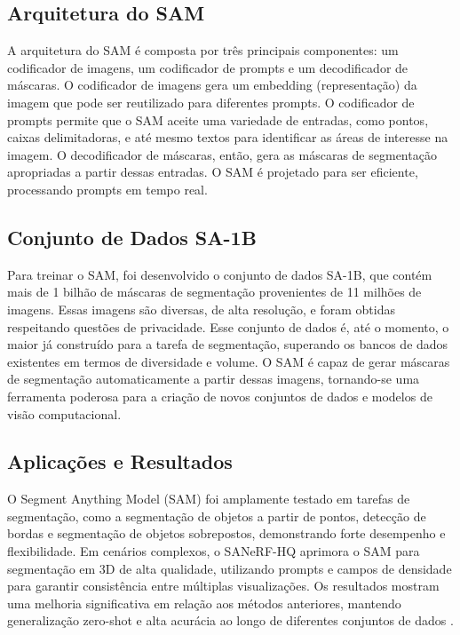 \subsection{Arquitetura do SAM}

A arquitetura do SAM é composta por três principais componentes: um codificador de imagens, um codificador de prompts e um decodificador de máscaras. O codificador de imagens gera um embedding (representação) da imagem que pode ser reutilizado para diferentes prompts. O codificador de prompts permite que o SAM aceite uma variedade de entradas, como pontos, caixas delimitadoras, e até mesmo textos para identificar as áreas de interesse na imagem. O decodificador de
máscaras, então, gera as máscaras de segmentação apropriadas a partir dessas entradas. O SAM é projetado para ser eficiente, processando prompts em tempo real.

\subsection{Conjunto de Dados SA-1B}

Para treinar o SAM, foi desenvolvido o conjunto de dados SA-1B, que contém mais de 1 bilhão de máscaras de segmentação provenientes de 11 milhões de imagens. Essas imagens são diversas, de alta resolução, e foram obtidas respeitando
questões de privacidade. Esse conjunto de dados é, até o momento, o maior já construído para a tarefa de segmentação, superando os bancos de dados existentes em termos de diversidade e volume. O SAM é capaz de gerar máscaras de
segmentação automaticamente a partir dessas imagens, tornando-se uma ferramenta poderosa para a criação de novos conjuntos de dados e modelos de visão computacional.

\subsection{Aplicações e Resultados}

O Segment Anything Model (SAM) foi amplamente testado em tarefas de segmentação, como a segmentação de objetos a partir de pontos, detecção de bordas e segmentação de objetos sobrepostos, demonstrando forte desempenho e flexibilidade. Em cenários complexos, o SANeRF-HQ aprimora o SAM para segmentação em 3D de alta qualidade, utilizando prompts e campos de densidade para garantir consistência entre múltiplas visualizações. Os resultados mostram uma melhoria significativa em relação aos métodos anteriores, mantendo generalização zero-shot e alta acurácia ao longo de diferentes conjuntos de dados \cite{liu2024sanerfhqsegmentnerfhigh}.


